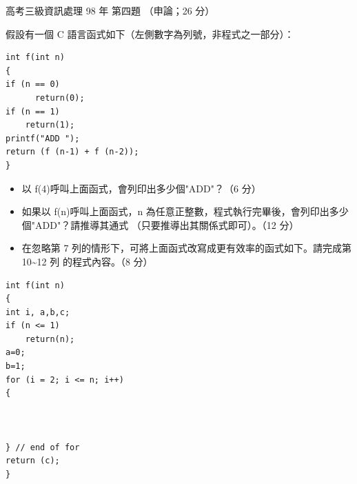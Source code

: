 \begin{pastexam}[label={px:gk3-098-ds-04}]{高考三級資訊處理 98 年 第四題}
（申論；26 分）

假設有一個 C 語言函式如下（左側數字為列號，非程式之一部分）：
\begin{verbatim}
int f(int n)
{
if (n == 0)
      return(0);
if (n == 1)
    return(1);
printf("ADD ");
return (f (n-1) + f (n-2));
}
\end{verbatim}
\begin{itemize}[leftmargin=2.2em]
\item[㈠] 以 f(4)呼叫上面函式，會列印出多少個"ADD"？（6 分）
\item[㈡] 如果以 f(n)呼叫上面函式，n 為任意正整數，程式執行完畢後，會列印出多少個"ADD"？請推導其通式
（只要推導出其關係式即可）。（12 分）
\item[㈢] 在忽略第 7 列的情形下，可將上面函式改寫成更有效率的函式如下。請完成第 10\textasciitilde 12 列
的程式內容。（8 分）
\end{itemize}
\begin{verbatim}
int f(int n)
{
int i, a,b,c;
if (n <= 1)
    return(n);
a=0;
b=1;
for (i = 2; i <= n; i++)
{



} // end of for
return (c);
}
\end{verbatim}
\end{pastexam}

